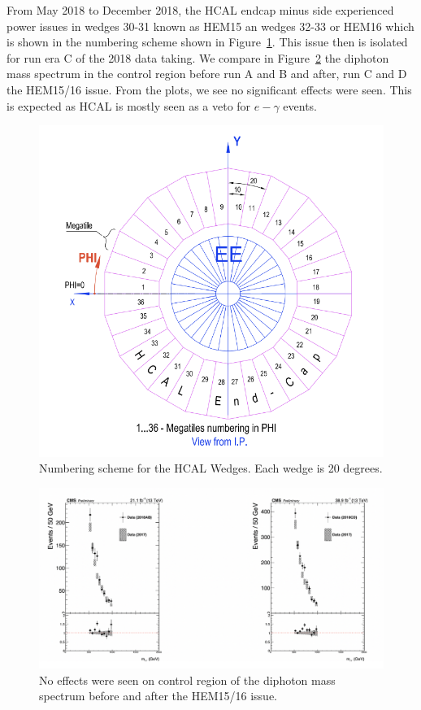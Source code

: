 From May 2018 to December 2018, the HCAL endcap minus side experienced power issues in wedges 30-31 known as HEM15 an wedges 32-33 or HEM16 which is shown in the numbering scheme shown in Figure~\ref{fig:HCALwedges}. This issue then is isolated for run era C of the 2018 data taking. We compare in Figure~\ref{fig:HEM1516BarrelBeforeAndAfter} the diphoton mass spectrum in the control region before run A and B and after, run C and D the HEM15/16 issue. From the plots, we see no significant effects were seen. This is expected as HCAL is mostly seen as a veto for $e-\gamma$ events. 

\begin{figure}[!htb]
	\centering
	\includegraphics[scale=0.65]{fig/NumberingSchemeHCALWedges.png}
	\caption{Numbering scheme for the HCAL Wedges. Each wedge is 20 degrees.}
	\label{fig:HCALwedges}
\end{figure}


\begin{figure}[!htb]
	\centering
	\includegraphics[scale=0.65]{fig/HEM15:16BarrelBeforeAndAfter.png}
	\caption{No effects were seen on control region of the diphoton mass spectrum before and after the HEM15/16 issue.}
	\label{fig:HEM1516BarrelBeforeAndAfter}
\end{figure}


